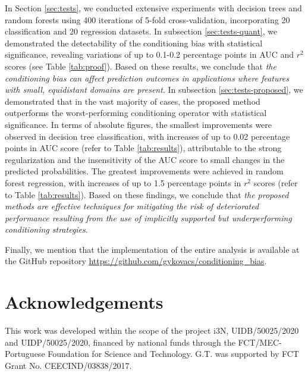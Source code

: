 \documentclass[sn-mathphys]{sn-jnl}%
\theoremstyle{thmstyleone}%
\theoremstyle{thmstyletwo}%
\theoremstyle{thmstylethree}%
\begin{document}
In Section \ref{sec:tests}, we conducted extensive experiments with decision trees and random forests using 400 iterations of 5-fold cross-validation, incorporating 20 classification and 20 regression datasets. In subsection \ref{sec:tests-quant}, we demonstrated the detectability of the conditioning bias with statistical significance, revealing variations of up to 0.1-0.2 percentage points in AUC and $r^2$ scores (see Table \ref{tab:proof}). Based on these results, we conclude that \emph{the conditioning bias can affect prediction outcomes in applications where features with small, equidistant domains are present}.
In subsection \ref{sec:tests-proposed}, we demonstrated that in the vast majority of cases, the proposed method outperforms the worst-performing conditioning operator with statistical significance. In terms of absolute figures, the smallest improvements were observed in decision tree classification, with increases of up to 0.02 percentage points in AUC score (refer to Table \ref{tab:results}), attributable to the strong regularization and the insensitivity of the AUC score to small changes in the predicted probabilities. The greatest improvements were achieved in random forest regression, with increases of up to 1.5 percentage points in $r^2$ scores (refer to Table \ref{tab:results}). Based on these findings, we conclude that \emph{the proposed methods are effective techniques for mitigating the risk of deteriorated performance resulting from the use of implicitly supported but underperforming conditioning strategies}.

Finally, we mention that the implementation of the entire analysis is available at the GitHub repository \url{https://github.com/gykovacs/conditioning_bias}.

\section*{Acknowledgements}

This work was developed within the scope of the project
i3N, UIDB/50025/2020 and UIDP/50025/2020, financed by
national funds through the FCT/MEC-Portuguese Foundation for Science and Technology. G.T. was supported by FCT
Grant No. CEECIND/03838/2017.



\end{document}
